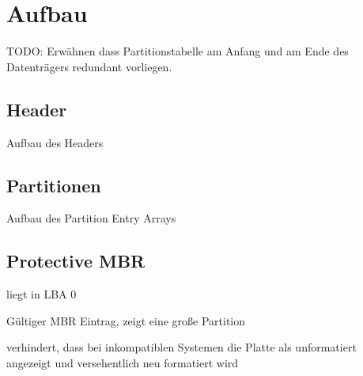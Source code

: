 \section{Aufbau}
\label{sec:structure}

TODO: Erwähnen dass Partitionstabelle am Anfang und am Ende des Datenträgers redundant vorliegen.

\subsection{Header}
\label{sec:structure:header}
Aufbau des Headers

\subsection{Partitionen}
Aufbau des Partition Entry Arrays

\subsection{Protective MBR}
liegt in LBA 0

Gültiger MBR Eintrag, zeigt eine große Partition

verhindert, dass bei inkompatiblen Systemen die Platte als unformatiert angezeigt und versehentlich neu formatiert wird
